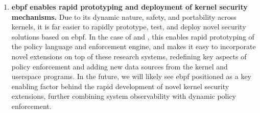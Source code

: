 \begin{enumerate}
  \item \textbf{\gls{ebpf} enables rapid prototyping and deployment of kernel security mechanisms.}
  Due to its dynamic nature, safety, and portability across kernels, it is far easier to
  rapidly prototype, test, and deploy novel security solutions based on \gls{ebpf}. In the
  case of \bpfbox{} and \bpfcontain{}, this enables rapid prototyping of the policy
  language and enforcement engine, and makes it easy to incorporate novel extensions on
  top of these research systems, redefining key aspects of policy enforcement and adding
  new data sources from the kernel and userspace programs. In the future, we will likely see
  \gls{ebpf} positioned as a key enabling factor behind the rapid development of novel kernel
  security extensions, further combining system observability with dynamic policy enforcement.
\end{enumerate}







